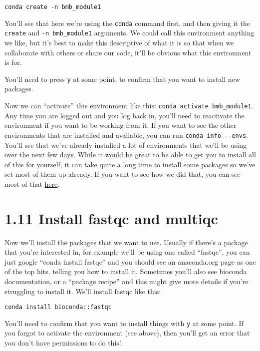 \documentclass[
]{book}
\begin{document}
\begin{verbatim}
conda create -n bmb_module1
\end{verbatim}

You'll see that here we're using the \texttt{conda} command first, and then giving it the \texttt{create} and \texttt{-n\ bmb\_module1} arguments. We could call this environment anything we like, but it's best to make this descriptive of what it is so that when we collaborate with others or share our code, it'll be obvious what this environment is for.

You'll need to press \texttt{y} at some point, to confirm that you want to install new packages.

Now we can ``activate'' this environment like this: \texttt{conda\ activate\ bmb\_module1}.
Any time you are logged out and you log back in, you'll need to reactivate the environment if you want to be working from it. If you want to see the other environments that are installed and available, you can run \texttt{conda\ info\ -\/-envs}. You'll see that we've already installed a lot of environments that we'll be using over the next few days. While it would be great to be able to get you to install all of this for yourself, it can take quite a long time to install some packages so we've set most of them up already. If you want to see how we did that, you can see most of that \href{https://github.com/LangilleLab/microbiome_helper/wiki/CBW-2024:-Initial-setup-of-environments}{here}.

\section{1.11 Install fastqc and multiqc}\label{install-fastqc-and-multiqc}

Now we'll install the packages that we want to use. Usually if there's a package that you're interested in, for example we'll be using one called ``fastqc'', you can just google ``conda install fastqc'' and you should see an anaconda.org page as one of the top hits, telling you how to install it. Sometimes you'll also see bioconda documentation, or a ``package recipe'' and this might give more details if you're struggling to install it. We'll install fastqc like this:

\begin{verbatim}
conda install bioconda::fastqc
\end{verbatim}

You'll need to confirm that you want to install things with \texttt{y} at some point. If you forgot to activate the environment (see above), then you'll get an error that you don't have permissions to do this!
\end{document}
